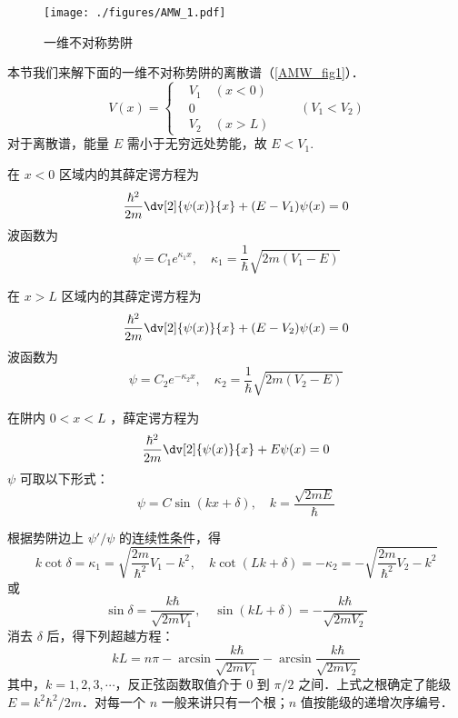 
\begin{issues}
\issueTODO
\end{issues}

\begin{figure}[ht]
\centering
\texttt{[image: ./figures/AMW\_1.pdf]}
\caption{一维不对称势阱} \label{AMW_fig1}
\end{figure}
本节我们来解下面的一维不对称势阱的离散谱（\autoref{AMW_fig1}）．
\begin{equation}
V(x)=\left\{\begin{aligned}
&V_1\quad(x<0)\\
&0\\
&V_2\quad(x>L)
\end{aligned}\right.
\qquad (V_1 < V_2)
\end{equation}
对于离散谱，能量 $E$ 需小于无穷远处势能，故 $E<V_1$. 

在 $x<0$ 区域内的其薛定谔方程为
\begin{equation}
\frac{\hbar^2}{2m}\dv[2]{\psi(x)}{x}+(E-V_1)\psi(x)=0
\end{equation}
波函数为
\begin{equation}
\psi=C_1 e^{\kappa_1 x},\quad \kappa_1=\frac{1}{\hbar}\sqrt{2m(V_1-E)}
\end{equation}

在 $x>L$ 区域内的其薛定谔方程为
\begin{equation}
\frac{\hbar^2}{2m}\dv[2]{\psi(x)}{x}+(E-V_2)\psi(x)=0
\end{equation}
波函数为
\begin{equation}
\psi=C_2 e^{-\kappa_2 x},\quad \kappa_2=\frac{1}{\hbar}\sqrt{2m(V_2-E)}
\end{equation}

在阱内 $0 < x < L$ ，薛定谔方程为
\begin{equation}
\frac{\hbar^2}{2m}\dv[2]{\psi(x)}{x}+E\psi(x)=0
\end{equation}
$\psi$ 可取以下形式：
\begin{equation}
\psi=C\sin(kx+\delta),\quad k=\frac{\sqrt{2mE}}{\hbar}
\end{equation}

根据势阱边上 $\psi'/\psi$ 的连续性条件，得
\begin{equation}
k\cot\delta=\kappa_1=\sqrt{\frac{2m}{\hbar^2}V_1-k^2},\quad k\cot(Lk+\delta)=-\kappa_2=-\sqrt{\frac{2m}{\hbar^2}V_2-k^2}
\end{equation}
或
\begin{equation}
\sin\delta=\frac{k\hbar}{\sqrt{2mV_1}},\quad\sin(kL+\delta)=-\frac{k\hbar}{\sqrt{2mV_2}}
\end{equation}
消去 $\delta$ 后，得下列超越方程：
\begin{equation}\label{AMW_eq1}
kL=n\pi-\arcsin\frac{k\hbar}{\sqrt{2mV_1}}-\arcsin\frac{k\hbar}{\sqrt{2mV_2}}
\end{equation}
其中，$k=1,2,3,\cdots$，反正弦函数取值介于 $0$ 到 $\pi/2$ 之间．上式之根确定了能级 $E=k^2\hbar^2/2m$．对每一个 $n$ 一般来讲只有一个根；$n$ 值按能级的递增次序编号．

